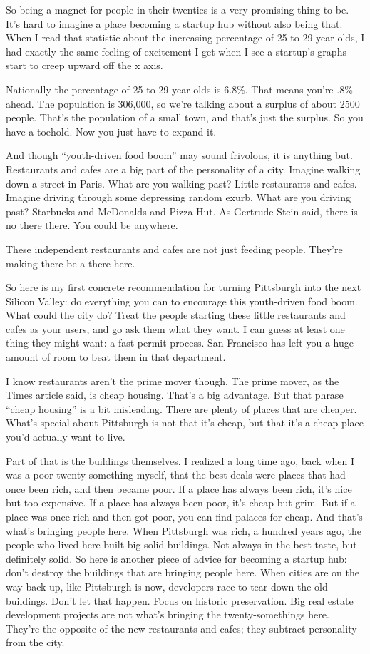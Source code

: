 \documentclass[12pt]{book}
\begin{document}
So being a magnet for people in their twenties is a very promising thing
to be. It's hard to imagine a place becoming a startup hub without also
being that. When I read that statistic about the increasing percentage
of 25 to 29 year olds, I had exactly the same feeling of excitement I
get when I see a startup's graphs start to creep upward off the x axis.

Nationally the percentage of 25 to 29 year olds is 6.8\%. That means
you're .8\% ahead. The population is 306,000, so we're talking about a
surplus of about 2500 people. That's the population of a small town, and
that's just the surplus. So you have a toehold. Now you just have to
expand it.

And though ``youth-driven food boom'' may sound frivolous, it is
anything but. Restaurants and cafes are a big part of the personality of
a city. Imagine walking down a street in Paris. What are you walking
past? Little restaurants and cafes. Imagine driving through some
depressing random exurb. What are you driving past? Starbucks and
McDonalds and Pizza Hut. As Gertrude Stein said, there is no there
there. You could be anywhere.

These independent restaurants and cafes are not just feeding people.
They're making there be a there here.

So here is my first concrete recommendation for turning Pittsburgh into
the next Silicon Valley: do everything you can to encourage this
youth-driven food boom. What could the city do? Treat the people
starting these little restaurants and cafes as your users, and go ask
them what they want. I can guess at least one thing they might want: a
fast permit process. San Francisco has left you a huge amount of room to
beat them in that department.

I know restaurants aren't the prime mover though. The prime mover, as
the Times article said, is cheap housing. That's a big advantage. But
that phrase ``cheap housing'' is a bit misleading. There are plenty of
places that are cheaper. What's special about Pittsburgh is not that
it's cheap, but that it's a cheap place you'd actually want to live.

Part of that is the buildings themselves. I realized a long time ago,
back when I was a poor twenty-something myself, that the best deals were
places that had once been rich, and then became poor. If a place has
always been rich, it's nice but too expensive. If a place has always
been poor, it's cheap but grim. But if a place was once rich and then
got poor, you can find palaces for cheap. And that's what's bringing
people here. When Pittsburgh was rich, a hundred years ago, the people
who lived here built big solid buildings. Not always in the best taste,
but definitely solid. So here is another piece of advice for becoming a
startup hub: don't destroy the buildings that are bringing people here.
When cities are on the way back up, like Pittsburgh is now, developers
race to tear down the old buildings. Don't let that happen. Focus on
historic preservation. Big real estate development projects are not
what's bringing the twenty-somethings here. They're the opposite of the
new restaurants and cafes; they subtract personality from the city.
\end{document}
